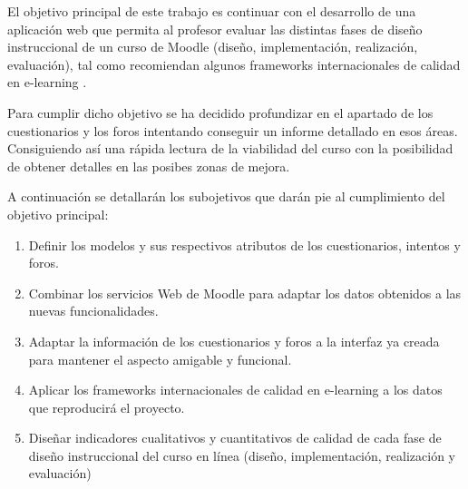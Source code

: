 
El objetivo principal de este trabajo es continuar con el desarrollo de una aplicación web que permita al profesor evaluar las distintas fases de diseño instruccional de un curso de Moodle (diseño, implementación, realización, evaluación), tal como recomiendan algunos frameworks internacionales de calidad en e-learning \cite{previotfg}.

Para cumplir dicho objetivo se ha decidido profundizar en el apartado de los cuestionarios y los foros intentando conseguir un informe detallado en esos áreas. Consiguiendo así una rápida lectura de la viabilidad del curso con la posibilidad de obtener detalles en las posibes zonas de mejora.

A continuación se detallarán los subojetivos que darán pie al cumplimiento del objetivo principal:
\begin{enumerate}
    \item Definir los modelos y sus respectivos atributos de los cuestionarios, intentos y foros.
    \item Combinar los servicios Web de Moodle para adaptar los datos obtenidos a las nuevas funcionalidades.
    \item Adaptar la información de los cuestionarios y foros a la interfaz ya creada para mantener el aspecto amigable y funcional.
    \item Aplicar los frameworks internacionales de calidad en e-learning a los datos que reproducirá el proyecto.
    \item Diseñar indicadores cualitativos y cuantitativos de calidad de cada fase de diseño instruccional del curso en línea (diseño, implementación, realización y evaluación)\cite{previotfg}
\end{enumerate}